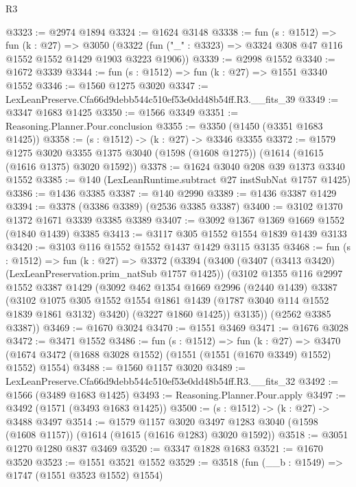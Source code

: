 \begin{lexlean}{R3}
\begin{coremodule}
@3323 := @2974 @1894
@3324 := @1624 @3148
@3338 := fun (s : @1512) =>
  fun (k : @27) =>
  @3050 (@3322 (fun ("_" : @3323) => @3324 @308 @47 @116 @1552 @1552 @1429 @1903 @3223 @1906))
@3339 := @2998 @1552
@3340 := @1672 @3339
@3344 := fun (s : @1512) => fun (k : @27) => @1551 @3340 @1552
@3346 := @1560 @1275 @3020
@3347 := LexLeanPreserve.Cfa66d9debb544c510ef53e0dd48b54ff.R3.__fits_39
@3349 := @3347 @1683 @1425
@3350 := @1566 @3349
@3351 := Reasoning.Planner.Pour.conclusion
@3355 := @3350 (@1450 (@3351 @1683 @1425))
@3358 := (s : @1512) -> (k : @27) -> @3346 @3355
@3372 := @1579
    @1275
    @3020
    @3355
    @1375
    @3040
    (@1598 (@1608 @1275))
    (@1614 (@1615 (@1616 @1375) @3020 @1592))
@3378 := @1624 @3040 @208 @39 @1373 @3340 @1552
@3385 := @140 (LexLeanRuntime.subtract @27 instSubNat @1757 @1425)
@3386 := @1436 @3385
@3387 := @140 @2990
@3389 := @1436 @3387 @1429
@3394 := @3378 (@3386 @3389) (@2536 @3385 @3387)
@3400 := @3102 @1370 @1372 @1671 @3339 @3385 @3389
@3407 := @3092 @1367 @1369 @1669 @1552 (@1840 @1439) @3385
@3413 := @3117 @305 @1552 @1554 @1839 @1439 @3133
@3420 := @3103 @116 @1552 @1552 @1437 @1429 @3115 @3135
@3468 := fun (s : @1512) =>
  fun (k : @27) =>
  @3372
    (@3394
      (@3400
        (@3407 (@3413 @3420) (LexLeanPreservation.prim_natSub @1757 @1425))
        (@3102
          @1355
          @116
          @2997
          @1552
          @3387
          @1429
          (@3092
            @462
            @1354
            @1669
            @2996
            (@2440 @1439)
            @3387
            (@3102
              @1075
              @305
              @1552
              @1554
              @1861
              @1439
              (@1787 @3040 @114 @1552 @1839 @1861 @3132)
              @3420)
            (@3227 @1860 @1425))
          @3135))
      (@2562 @3385 @3387))
@3469 := @1670 @3024
@3470 := @1551 @3469
@3471 := @1676 @3028
@3472 := @3471 @1552
@3486 := fun (s : @1512) =>
  fun (k : @27) =>
  @3470 (@1674 @3472 (@1688 @3028 @1552) (@1551 (@1551 (@1670 @3349) @1552) @1552) @1554)
@3488 := @1560 @1157 @3020
@3489 := LexLeanPreserve.Cfa66d9debb544c510ef53e0dd48b54ff.R3.__fits_32
@3492 := @1566 (@3489 @1683 @1425)
@3493 := Reasoning.Planner.Pour.apply
@3497 := @3492 (@1571 (@3493 @1683 @1425))
@3500 := (s : @1512) -> (k : @27) -> @3488 @3497
@3514 := @1579
    @1157
    @3020
    @3497
    @1283
    @3040
    (@1598 (@1608 @1157))
    (@1614 (@1615 (@1616 @1283) @3020 @1592))
@3518 := @3051 @1270 @1280 @837 @3469
@3520 := @3347 @1828 @1683
@3521 := @1670 @3520
@3523 := @1551 @3521 @1552
@3529 := @3518 (fun (__b : @1549) => @1747 (@1551 @3523 @1552) @1554)

\end{coremodule}
\end{lexlean}
